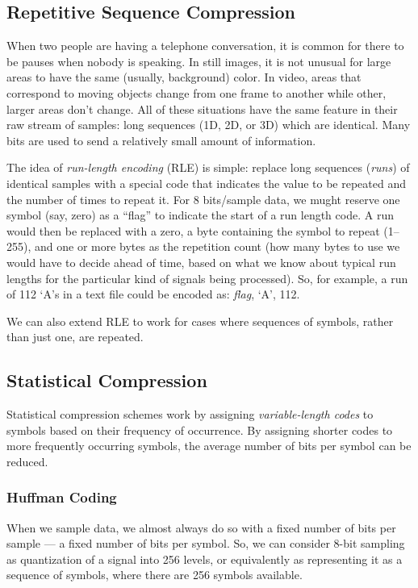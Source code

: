 \subsection{Repetitive Sequence Compression}

When two people are having a telephone conversation, it is common for
there to be pauses when nobody is speaking. In still images, it is not
unusual for large areas to have the same (usually, background)
color. In video, areas that correspond to moving objects change from
one frame to another while other, larger areas don't change.  All of
these situations have the same feature in their raw stream of samples:
long sequences (1D, 2D, or 3D) which are identical. Many bits are used
to send a relatively small amount of information.

The idea of \emph{run-length encoding} (RLE) is simple: replace long
sequences (\emph{runs}) of identical samples with a special code that
indicates the value to be repeated and the number of times to repeat
it. For 8 bits/sample data, we mught reserve one symbol (say, zero) as
a ``flag'' to indicate the start of a run length code. A run would
then be replaced with a zero, a byte containing the symbol to repeat
(1--255), and one or more bytes as the repetition count (how many
bytes to use we would have to decide ahead of time, based on what we
know about typical run lengths for the particular kind of signals
being processed). So, for example, a run of 112 `A's in a text file
could be encoded as: \textit{flag}, `A', 112.

We can also extend RLE to work for cases where sequences of symbols,
rather than just one, are repeated.

\subsection{Statistical Compression}

Statistical compression schemes work by assigning
\emph{variable-length codes} to symbols based on their frequency of
occurrence.  By assigning shorter codes to more frequently occurring
symbols, the average number of bits per symbol can be reduced.

\subsubsection{Huffman Coding}

When we sample data, we almost always do so with a fixed number of
bits per sample --- a fixed number of bits per symbol. So, we can
consider 8-bit sampling as quantization of a signal into 256 levels,
or equivalently as representing it as a sequence of symbols, where
there are 256 symbols available.

